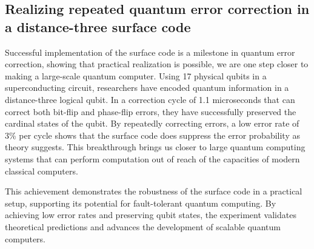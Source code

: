 \subsection{Realizing repeated quantum error correction in a distance-three surface code}
Successful implementation of the surface code is a milestone in quantum error correction, showing that practical realization is possible, we are one step closer to making a large-scale quantum computer. Using 17 physical qubits in a superconducting circuit, researchers have encoded quantum information in a distance-three logical qubit. In a correction cycle of 1.1 microseconds that can correct both bit-flip and phase-flip errors, they have successfully preserved the cardinal states of the qubit. By repeatedly correcting errors, a low error rate of 3\% per cycle shows that the surface code does suppress the error probability as theory suggests. This breakthrough brings us closer to large quantum computing systems that can perform computation out of reach of the capacities of modern classical computers.

This achievement demonstrates the robustness of the surface code in a practical setup, supporting its potential for fault-tolerant quantum computing. By achieving low error rates and preserving qubit states, the experiment validates theoretical predictions and advances the development of scalable quantum computers.
